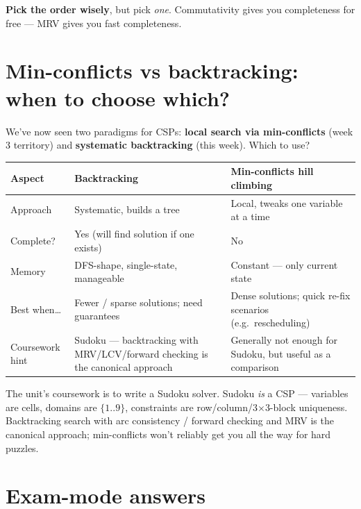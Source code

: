 \documentclass[11pt, a4paper]{article}
\newcommand{\thead}[1]{\textbf{#1}}
\begin{document}
\textbf{Pick the order wisely}, but pick \emph{one}. Commutativity gives you completeness for free — MRV gives you fast completeness.

\section{Min-conflicts vs backtracking: when to choose which?}

We've now seen two paradigms for CSPs: \textbf{local search via min-conflicts} (week 3 territory) and \textbf{systematic backtracking} (this week). Which to use?

\begin{center}
\renewcommand{\arraystretch}{1.25}
\begin{tabular}{@{}p{4.5cm}p{4.5cm}p{5cm}@{}}
\toprule
\thead{Aspect} & \thead{Backtracking} & \thead{Min-conflicts hill climbing} \\
\midrule
Approach          & Systematic, builds a tree                  & Local, tweaks one variable at a time \\
Complete?         & Yes (will find solution if one exists)     & No \\
Memory            & DFS-shape, single-state, manageable        & Constant — only current state \\
Best when\dots    & Fewer / sparse solutions; need guarantees  & Dense solutions; quick re-fix scenarios (e.g.\ rescheduling) \\
Coursework hint   & Sudoku — backtracking with MRV/LCV/forward checking is the canonical approach & Generally not enough for Sudoku, but useful as a comparison \\
\bottomrule
\end{tabular}
\end{center}

\begin{notebox}
The unit's coursework is to write a Sudoku solver. Sudoku \emph{is} a CSP — variables are cells, domains are $\{1..9\}$, constraints are row/column/3$\times$3-block uniqueness. Backtracking search with arc consistency / forward checking and MRV is the canonical approach; min-conflicts won't reliably get you all the way for hard puzzles.
\end{notebox}

\section{Exam-mode answers}
\end{document}
